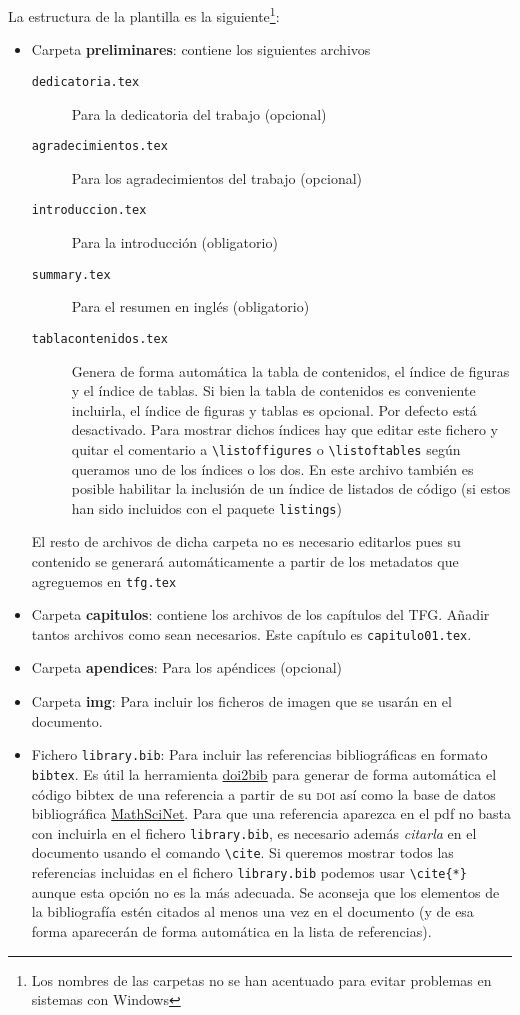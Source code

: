 La estructura de la plantilla es la siguiente\footnote{Los nombres de las carpetas no se han acentuado para evitar problemas en sistemas con Windows}: 
\begin{itemize}
  \item Carpeta \textbf{preliminares}: contiene los siguientes archivos
    \begin{description}
      \item[\texttt{dedicatoria.tex}] Para la dedicatoria del trabajo (opcional)
      \item[\texttt{agradecimientos.tex}] Para los agradecimientos del trabajo (opcional)
      \item[\texttt{introduccion.tex}] Para la introducción (obligatorio)
      \item[\texttt{summary.tex}] Para el resumen en inglés (obligatorio)
      \item[\texttt{tablacontenidos.tex}] Genera de forma automática la tabla de contenidos, el índice de figuras y el índice de tablas. Si bien la tabla de contenidos es conveniente incluirla, el índice de figuras y tablas es opcional. Por defecto está desactivado. Para mostrar dichos índices hay que editar este fichero y quitar el comentario a \verb+\listoffigures+ o \verb+\listoftables+ según queramos uno de los índices o los dos. En este archivo también es posible habilitar la inclusión de un índice de listados de código (si estos han sido incluidos con el paquete \texttt{listings})
  \end{description}
  El resto de archivos de dicha carpeta no es necesario editarlos pues su contenido se generará automáticamente a partir de los metadatos que agreguemos en \texttt{tfg.tex}

  \item Carpeta \textbf{capitulos}: contiene los archivos de los capítulos del TFG. Añadir tantos archivos como sean necesarios. Este capítulo es \texttt{capitulo01.tex}.

  \item Carpeta \textbf{apendices}: Para los apéndices (opcional)
  \item Carpeta \textbf{img}: Para incluir los ficheros de imagen que se usarán en el documento.
    
  \item Fichero \texttt{library.bib}: Para incluir las referencias bibliográficas en formato \texttt{bibtex}. Es útil la herramienta \href{https://www.doi2bib.org/}{doi2bib} para generar de forma automática el código bibtex de una referencia a partir de su \textsc{doi}  así como la base de datos bibliográfica \href{https://mathscinet.ams.org}{MathSciNet}. Para que una referencia aparezca en el pdf no basta con incluirla en el fichero \texttt{library.bib}, es necesario además \emph{citarla} en el documento usando el comando \verb+\cite+. Si queremos mostrar todos las referencias incluidas en el fichero \texttt{library.bib} podemos usar \verb+\cite{*}+ aunque esta opción no es la más adecuada. Se aconseja que los elementos de la bibliografía estén citados al menos una vez en el documento (y de esa forma aparecerán de forma automática en la lista de referencias).


\end{itemize}
